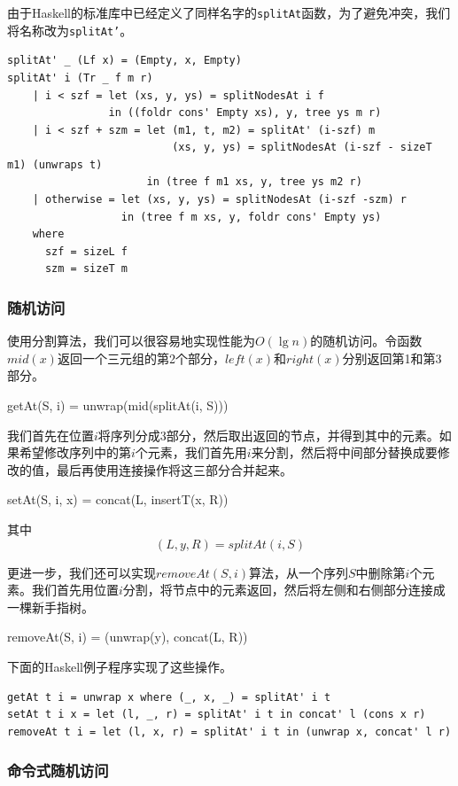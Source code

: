 \documentclass[b5paper]{ctexart}
\begin{document}
由于Haskell的标准库中已经定义了同样名字的\texttt{splitAt}函数，为了避免冲突，我们将名称改为\texttt{splitAt'}。

\begin{lstlisting}[style=Haskell]
splitAt' _ (Lf x) = (Empty, x, Empty)
splitAt' i (Tr _ f m r)
    | i < szf = let (xs, y, ys) = splitNodesAt i f
                in ((foldr cons' Empty xs), y, tree ys m r)
    | i < szf + szm = let (m1, t, m2) = splitAt' (i-szf) m
                          (xs, y, ys) = splitNodesAt (i-szf - sizeT m1) (unwraps t)
                      in (tree f m1 xs, y, tree ys m2 r)
    | otherwise = let (xs, y, ys) = splitNodesAt (i-szf -szm) r
                  in (tree f m xs, y, foldr cons' Empty ys)
    where
      szf = sizeL f
      szm = sizeT m
\end{lstlisting}

\subsubsection{随机访问}

使用分割算法，我们可以很容易地实现性能为$O(\lg n)$的随机访问。令函数$mid(x)$返回一个三元组的第2个部分，$left(x)$和$right(x)$分别返回第1和第3部分。

\be
getAt(S, i) = unwrap(mid(splitAt(i, S)))
\ee

我们首先在位置$i$将序列分成3部分，然后取出返回的节点，并得到其中的元素。如果希望修改序列中的第$i$个元素，我们首先用$i$来分割，然后将中间部分替换成要修改的值，最后再使用连接操作将这三部分合并起来。

\be
setAt(S, i, x) = concat(L, insertT(x, R))
\ee

其中
\[
(L, y, R) = splitAt(i, S)
\]

更进一步，我们还可以实现$removeAt(S, i)$算法，从一个序列$S$中删除第$i$个元素。我们首先用位置$i$分割，将节点中的元素返回，然后将左侧和右侧部分连接成一棵新手指树。

\be
removeAt(S, i) = (unwrap(y), concat(L, R))
\ee

下面的Haskell例子程序实现了这些操作。

\lstset{language=Haskell}
\begin{lstlisting}[style=Haskell]
getAt t i = unwrap x where (_, x, _) = splitAt' i t
setAt t i x = let (l, _, r) = splitAt' i t in concat' l (cons x r)
removeAt t i = let (l, x, r) = splitAt' i t in (unwrap x, concat' l r)
\end{lstlisting}

\subsubsection{命令式随机访问}
\end{document}
